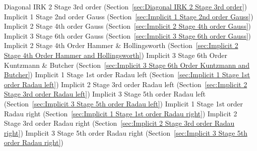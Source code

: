 \begin{list}{}
      \newline 
    Diagonal IRK 2 Stage 3rd order (Section~\ref{sec:Diagonal IRK 2 Stage 3rd order})
      \newline 
    Implicit 1 Stage 2nd order Gauss (Section~\ref{sec:Implicit 1 Stage 2nd order Gauss})
      \newline 
    Implicit 2 Stage 4th order Gauss (Section~\ref{sec:Implicit 2 Stage 4th order Gauss})
      \newline 
    Implicit 3 Stage 6th order Gauss (Section~\ref{sec:Implicit 3 Stage 6th order Gauss})
      \newline 
    Implicit 2 Stage 4th Order Hammer \& Hollingsworth (Section~\ref{sec:Implicit 2 Stage 4th Order Hammer and Hollingsworth})
      \newline 
    Implicit 3 Stage 6th Order Kuntzmann \& Butcher (Section~\ref{sec:Implicit 3 Stage 6th Order Kuntzmann and Butcher})
      \newline 
    Implicit 1 Stage 1st order Radau left (Section~\ref{sec:Implicit 1 Stage 1st order Radau left})
      \newline 
    Implicit 2 Stage 3rd order Radau left (Section~\ref{sec:Implicit 2 Stage 3rd order Radau left})
      \newline 
    Implicit 3 Stage 5th order Radau left (Section~\ref{sec:Implicit 3 Stage 5th order Radau left})
      \newline 
    Implicit 1 Stage 1st order Radau right (Section~\ref{sec:Implicit 1 Stage 1st order Radau right})
      \newline 
    Implicit 2 Stage 3rd order Radau right (Section~\ref{sec:Implicit 2 Stage 3rd order Radau right})
      \newline 
    Implicit 3 Stage 5th order Radau right (Section~\ref{sec:Implicit 3 Stage 5th order Radau right})
      \newline 

\end{list}
